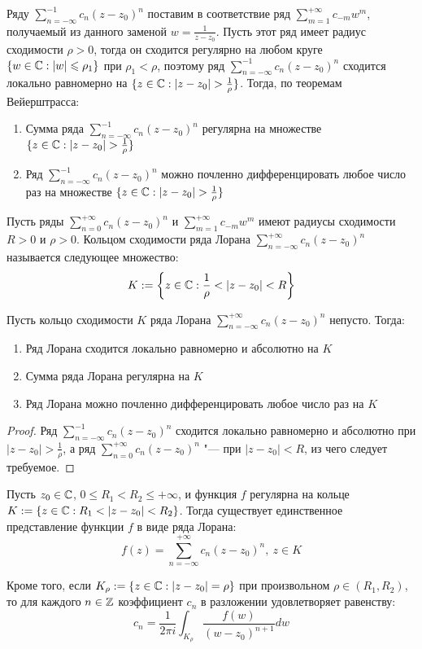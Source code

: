 \begin{note}
	Ряду $\sum_{n = -\infty}^{-1}c_n(z - z_0)^n$ поставим в соответствие ряд $\sum_{m = 1}^{+\infty}c_{-m}w^m$, получаемый из данного заменой $w = \frac1{z - z_0}$. Пусть этот ряд имеет радиус сходимости $\rho > 0$, тогда он сходится регулярно на любом круге $\{w \in \mathbb{C}: |w| \leqslant \rho_1\}$ при $\rho_1 < \rho$, поэтому ряд $\sum_{n = -\infty}^{-1}c_n(z - z_0)^n$ сходится локально равномерно на $\{z \in \mathbb{C}: |z - z_0| > \frac1\rho\}$. Тогда, по теоремам Вейерштрасса:
	\begin{enumerate}
		\item Сумма ряда $\sum_{n = -\infty}^{-1}c_n(z - z_0)^n$ регулярна на множестве $\{z \in \mathbb{C}: |z - z_0| > \frac1\rho\}$
		\item Ряд $\sum_{n = -\infty}^{-1}c_n(z - z_0)^n$ можно почленно дифференцировать любое число раз на множестве $\{z \in \mathbb{C}: |z - z_0| > \frac1\rho\}$
	\end{enumerate}
\end{note}

\begin{definition}
	Пусть ряды $\sum_{n = 0}^{+\infty}c_n(z - z_0)^n$ и $\sum_{m = 1}^{+\infty}c_{-m}w^m$ имеют радиусы сходимости $R > 0$ и $\rho > 0$. Кольцом сходимости ряда Лорана $\sum_{n = -\infty}^{+\infty}c_n(z - z_0)^n$ называется следующее множество:
	\[K := \left\{z \in \mathbb{C}: \frac1\rho < |z - z_0| < R\right\}\]
\end{definition}

\begin{proposition}
	Пусть кольцо сходимости $K$ ряда Лорана $\sum_{n = -\infty}^{+\infty}c_n(z - z_0)^n$ непусто. Тогда:
	\begin{enumerate}
		\item Ряд Лорана сходится локально равномерно и абсолютно на $K$
		\item Сумма ряда Лорана регулярна на $K$
		\item Ряд Лорана можно почленно дифференцировать любое число раз на $K$
	\end{enumerate}
\end{proposition}

\begin{proof}
	Ряд $\sum_{n = -\infty}^{-1}c_n(z - z_0)^n$ сходится локально равномерно и абсолютно при $|z - z_0| > \frac{1}\rho$, а ряд $\sum_{n = 0}^{+\infty}c_n(z - z_0)^n$ "--- при $|z - z_0| < R$, из чего следует требуемое.
\end{proof}

\begin{theorem}
	Пусть $z_0 \in \mathbb{C}$, $0 \le R_1 < R_2 \le +\infty$, и функция $f$ регулярна на кольце $K := \{z \in \mathbb{C}: R_1 < |z - z_0| < R_2\}$. Тогда существует единственное представление функции $f$ в виде ряда Лорана:
	\[f(z) = \sum_{n = -\infty}^{+\infty}c_n(z - z_0)^n,~z \in K\]
	
	Кроме того, если $K_\rho := \{z \in \mathbb{C}: |z - z_0| = \rho\}$ при произвольном $\rho \in (R_1, R_2)$, то для каждого $n \in \mathbb{Z}$ коэффициент $c_n$ в разложении удовлетворяет равенству: \pagebreak
	\[c_n = \frac1{2\pi i}\int_{K_{\rho}} \frac{f(w)}{(w - z_0)^{n+1}}dw\]
\end{theorem}

